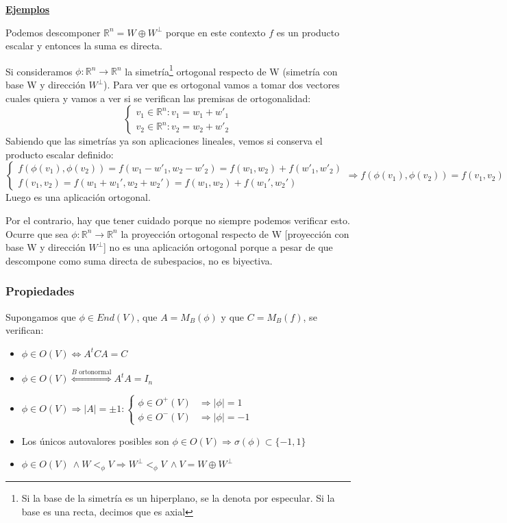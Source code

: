 \documentclass[10pt,a4paper,openright]{book}
\theoremstyle{break}
\begin{document}
\underline{\textbf{Ejemplos}}

Podemos descomponer $\mathbb{R}^n = W \oplus W^\perp$ porque en este contexto $f$ es un producto escalar y entonces la suma es directa.

Si consideramos $\phi:\mathbb{R}^n  \to \mathbb{R}^n$ la simetría\footnote{Si la base de la simetría es un hiperplano, se la denota por especular. Si la base es una recta, decimos que es axial} ortogonal respecto de W (simetría con base W y dirección $W^\perp$). Para ver que es ortogonal vamos a tomar dos vectores cuales quiera y vamos a ver si se verifican las premisas de ortogonalidad:
$$\begin{cases} v_1 \in \mathbb{R}^n : v_1 = w_1 + w'_1 \\ v_2 \in \mathbb{R}^n : v_2 = w_2 + w'_2 \end{cases}$$
Sabiendo que las simetrías ya son aplicaciones lineales, vemos si conserva el producto escalar definido:
$$\begin{cases} f(\phi(v_1), \phi(v_2)) = f( w_1 - w'_1,w_2 - w'_2) = f(w_1, w_2) + f(w'_1,w'_2) \\ f(v_1, v_2) = f(w_1+w_1', w_2+w_2') = f(w_1, w_2) + f(w_1', w_2') \end{cases}\Rightarrow f(\phi(v_1), \phi(v_2)) = f(v_1, v_2)$$
Luego es una aplicación ortogonal.

Por el contrario, hay que tener cuidado porque no siempre podemos verificar esto. Ocurre que sea $\phi:\mathbb{R}^n  \to \mathbb{R}^n$ la proyección ortogonal respecto de W [proyección con base W y dirección $W^\perp$] no es una aplicación ortogonal porque a pesar de que descompone como suma directa de subespacios, no es biyectiva.

\subsubsection*{Propiedades}
Supongamos que $\phi\in End(V)$, que $A = M_B(\phi)$ y que $C = M_B(f)$, se verifican:
\begin{itemize}
\item $\phi\in O(V)\Leftrightarrow A^t C A = C $

\item $\phi\in O(V) \stackrel{B\mbox{ ortonormal}}{\Leftrightarrow} A^t A = I_n$

\item $\phi \in O(V)\Rightarrow |A| = \pm 1: \begin{cases} \phi \in O^+(V) & \Rightarrow |\phi| = 1 \\ \phi \in O^-(V) & \Rightarrow |\phi| = -1\end{cases}$

\item Los únicos autovalores posibles son $\phi\in O(V)\Rightarrow \sigma(\phi) \subset \{-1, 1\}$

\item $\phi\in O(V) \ \wedge W<_\phi V\Rightarrow W^\perp <_\phi V \ \wedge V = W \oplus W^\perp$
\end{itemize}
\end{document}

